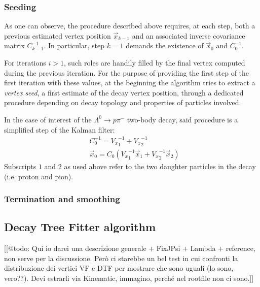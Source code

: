 \subsubsection{Seeding}

As one can observe, the procedure described above requires, at each step, both a previous estimated vertex position $\vec{x}_{k-1}$ and an associated inverse covariance matrix $C_{k-1}^{-1}$. In particular, step $k=1$ demands the existence of $\vec{x}_0$ and $C_{0}^{-1}$.

For iterations $i>1$, such roles are handily filled by the final vertex computed during the previous iteration. For the purpose of providing the first step of the first iteration with these values, at the beginning the algorithm tries to extract a \textit{vertex seed}, a first estimate of the decay vertex position, through a dedicated procedure depending on decay topology and properties of particles involved.

In the case of interest of the $\Lambda^0 \rightarrow p \pi^-$ two-body decay, said procedure is a simplified step of the Kalman filter:
\begin{subequations}
\begin{align}
	&C^{-1}_0 = {V_x}^{-1}_1 + {V_x}^{-1}_2 \\
	&\vec{x}_0 = C_0 \left(
		{V_x}^{-1}_1 \vec{x}_1 + {V_x}^{-1}_2 \vec{x}_2
	\right)
\end{align}
\end{subequations}
Subscripts $1$ and $2$ as used above refer to the two daughter particles in the decay (i.e. proton and pion).

\subsubsection{Termination and smoothing}


\subsection{Decay Tree Fitter algorithm}
[[@todo: Qui io darei una descrizione generale + FixJPsi + Lambda + reference, non serve per la discussione. Però ci starebbe un bel test in cui confronti la distribuzione dei vertici VF e DTF per mostrare che sono uguali (lo sono, vero??). Devi estrarli via Kinematic, immagino, perché nel rootfile non ci sono.]]


